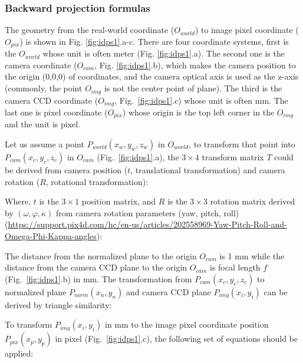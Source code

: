 

\subsubsection{Backward projection formulas}

The geometry from the real-world coordinate ($O_{world}$) to image pixel coordinate ($O_{pix}$) is shown in Fig. \ref{fig:idps1}.a-c. There are four coordinate systems, first is the $O_{world}$ whose unit is often meter (Fig. \ref{fig:idps1}.a). The second one is the camera coordinate ($O_{cam}$, Fig. \ref{fig:idps1}.b), which makes the camera position to the origin (0,0,0) of coordinates, and the camera optical axis is used as the z-axis (commonly, the point $O_{img}$ is not the center point of plane). The third is the camera CCD coordinate ($O_{img}$, Fig.~\ref{fig:idps1}.c) whose unit is often mm. The last one is pixel coordinate ($O_{pix}$) whose origin is the top left corner in the $O_{img}$ and the unit is pixel.

Let us assume a point $P_{world} (x_w,y_w,z_w)$ in $O_{world}$, to transform that point into $P_{cam} (x_c,y_c,z_c)$ in $O_{cam}$ (Fig.~\ref{fig:idps1}.a), the $3\times4$ transform matrix $T$ could be derived from camera position ($t$, translational transformation) and camera rotation ($R$, rotational transformation):



\noindent 
Where, $t$ is the $3\times1$ position matrix, and $R$ is the $3\times3$ rotation matrix derived by $(\omega, \varphi, \kappa)$ from camera rotation parameters (yaw, pitch, roll) (\url{https://support.pix4d.com/hc/en-us/articles/202558969-Yaw-Pitch-Roll-and-Omega-Phi-Kappa-angles}):

% 

The distance from the normalized plane to the origin $O_{cam}$  is 1 mm while the distance from the camera CCD plane to the origin $O_{cam}$ is focal length $f$ (Fig.~\ref{fig:idps1}.b) in mm. The transformation from $P_{cam}(x_c,y_c,z_c)$ to normalized plane $P_{norm} (x_n,y_n)$ and camera CCD plane $P_{img} (x_i,y_i)$ can be derived by triangle similarity:



To transform $P_{img} (x_i,y_i)$ in mm to the image pixel coordinate position $P_{pix} (x_p,y_p)$ in pixel (Fig.~\ref{fig:idps1}.c), the following set of equations should be applied:

